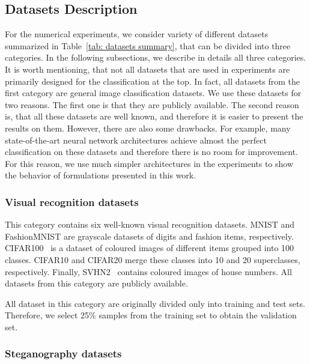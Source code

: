 \newpage

\subsection{Datasets Description}

For the numerical experiments, we consider variety of different datasets summarized in Table~\ref{tab: datasets summary}, that can be divided into three categories. In the following subsections, we describe in details all three categories. It is worth mentioning, that not all datasets that are used in experiments are primarily designed for the classification at the top. In fact, all datasets from the first category are general image classification datasets. We use these datasets for two reasons. The first one is that they are publicly available. The second reason is, that all these datasets are well known, and therefore it is easier to present the results on them. However, there are also some drawbacks. For example, many state-of-the-art neural network architectures achieve almost the perfect classification on these datasets and therefore there is no room for improvement. For this reason, we use much simpler architectures in the experiments to show the behavior of formulations presented in this work.

\subsubsection{Visual recognition datasets}

This category contains six well-known visual recognition datasets. MNIST \cite{deng2012mnist} and FashionMNIST \cite{xiao2017fashionmnist} are grayscale datasets of digits and fashion items, respectively. CIFAR100~\cite{krizhevsky2009learning} is a dataset of coloured images of different items grouped into 100 classes. CIFAR10 and CIFAR20 merge these classes into 10 and 20 superclasses, respectively. Finally, SVHN2~\cite{netzer2011reading} contains coloured images of house numbers. All datasets from this category are publicly available.

All dataset in this category are originally divided only into training and test sets. Therefore, we select 25\% samples from the training set to obtain the validation set. 

\subsubsection{Steganography datasets}

